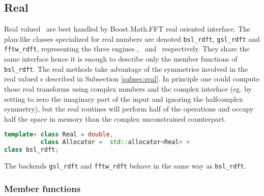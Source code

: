 \subsection{Real \dft}
Real valued \dft\ are best handled by Boost.Math.FFT real oriented
interface. The plan-like classes specialized for real numbers are denoted
\verb|bsl_rdft|, \verb|gsl_rdft| and \verb|fftw_rdft|, 
representing the three
engines \bsl, \gsl\ and \fftw\ respectively. They share the same interface hence
it is enough to describe only the member functions of \verb|bsl_rdft|.
The real methods take advantage of the symmetries involved in the real valued
\dft s described in Subsection \ref{subsec:real}. In principle one could compute
those real transforms using complex numbers and the complex interface (eg. by
setting to zero the imaginary part of the input and ignoring the halfcomplex
symmetry), but the real routines will perform
half of the operations and occupy half the space in memory than the complex
unconstrained counterpart.
\begin{lstlisting}[language=C++,caption=Real plan.]
template< class Real = double, 
          class Allocator =  std::allocator<Real> >
class bsl_rdft;
\end{lstlisting}

The backends \verb|gsl_rdft| and \verb|fftw_rdft| behave in the same way as
\verb|bsl_rdft|.

\subsubsection*{Member functions}

